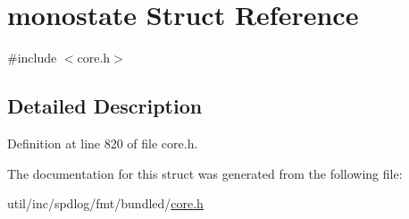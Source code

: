 \hypertarget{structmonostate}{}\section{monostate Struct Reference}
\label{structmonostate}


{\ttfamily \#include $<$core.\+h$>$}



\subsection{Detailed Description}


Definition at line 820 of file core.\+h.



The documentation for this struct was generated from the following file\+:\begin{DoxyCompactItemize}
\item 
util/inc/spdlog/fmt/bundled/\hyperlink{core_8h}{core.\+h}\end{DoxyCompactItemize}
